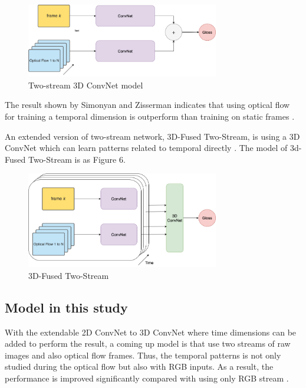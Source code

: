 \documentclass[a4paper, 12pt]{article}
\begin{document}
\begin{figure}[H]
    \centering
    \includegraphics[width=0.75\textwidth]{Two-stream ConvNet Model.png}
    \caption{Two-stream 3D ConvNet model}
    \label{Figure 2-stream 3D ConvNet}
\end{figure}

The result shown by Simonyan and Zisserman indicates that using optical flow for training a temporal dimension is outperform than training on static frames \citep{karpathy2014large}.

An extended version of two-stream network, 3D-Fused Two-Stream, is using a 3D ConvNet which can learn patterns related to temporal directly \citep{carreira2017quo}. The model of 3d-Fused Two-Stream is as Figure 6.

\begin{figure}[H]
    \centering
    \includegraphics[width=0.75\textwidth]{3D-Fused Two-stream.png}
    \caption{3D-Fused Two-Stream}
    \label{Figure 3D-Fused Two Stream}
\end{figure}

\subsection{Model in this study}
With the extendable 2D ConvNet to 3D ConvNet where time dimensions can be added to perform the result, a coming up model is that use two streams of raw images and also optical flow frames. Thus, the temporal patterns is not only studied during the optical flow but also with RGB inputs. As a result, the performance is improved significantly compared with using only RGB stream \citep{carreira2017quo}.
\end{document}
